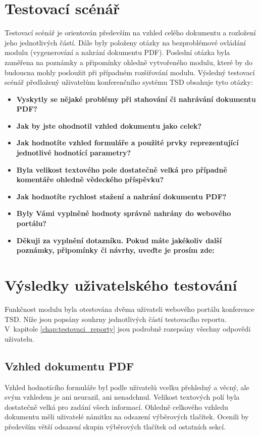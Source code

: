 \section{Testovací scénář}
Testovací scénář je orientován především na vzhled celého dokumentu a rozložení jeho jednotlivých částí. Dále byly položeny otázky na bezproblémové ovládání modulu (vygenerování a nahrání dokumentu PDF). Poslední otázka byla zaměřena na poznámky a připomínky ohledně vytvořeného modulu, které by do budoucna mohly posloužit při případném rozšiřování modulu.
Výsledný testovací scénář předložený uživatelům konferenčního systému TSD obsahuje tyto otázky:
\begin{itemize}
	\item \textbf{Vyskytly se nějaké problémy při stahování či nahrávání dokumentu PDF?}
	\item \textbf{Jak by jste ohodnotil vzhled dokumentu jako celek?}
	\item \textbf{Jak hodnotíte vzhled formuláře a použité prvky reprezentující jednotlivé hodnotící parametry?}
	\item \textbf{Byla velikost textového pole dostatečně velká pro případně komentáře ohledně vědeckého příspěvku?}
	\item \textbf{Jak hodnotíte rychlost stažení a nahrání dokumentu PDF?} 
	\item \textbf{Byly Vámi vyplněné hodnoty správně nahrány do webového portálu?}
	\item \textbf{Děkuji za vyplnění dotazníku. Pokud máte jakékoliv další poznámky, připomínky či návrhy, uveďte je prosím zde:}
\end{itemize}

\section{Výsledky uživatelského testování}
Funkčnost modulu byla otestována dvěma uživateli webového portálu konference TSD. Níže jsou popsány souhrny jednotlivých částí testovacího reportu. V~kapitole \ref{chap:testovaci_reporty} jsou podrobně rozepsány všechny odpovědi uživatelu.
\subsection{Vzhled dokumentu PDF}
Vzhled hodnotícího formuláře byl podle uživatelů vcelku přehledný a věcný, ale svým vzhledem je ani neurazil, ani nenadchnul. Velikost textových polí byla dostatečně velká pro zadání všech informací. Ohledně celkového vzhledu dokumentu měli uživatelé námitku na odsazení výběrových tlačítek. Ocenili by především větší odsazení skupin výběrových tlačítek od ostatních sekcí.
